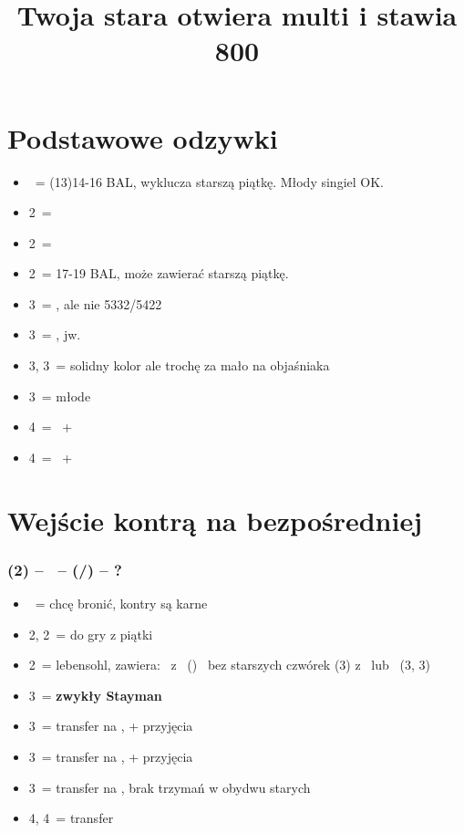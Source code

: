\documentclass[12pt, a4paper]{article}
\title{Twoja stara otwiera multi i stawia 800}
\begin{document}
\section{Podstawowe odzywki}
\begin{itemize}
    \item \dbl\ = (13)14-16 BAL, wyklucza starszą piątkę. Młody singiel OK. \vimp
    \item 2\hearts\ = \hearts
    \item 2\spades\ = \spades
    \item 2\nt\ = 17-19 BAL, może zawierać starszą piątkę. \imp \br
    \item 3\clubs\ = \clubs, ale nie 5332/5422
    \item 3\diams\ = \diams, jw.
    \item 3\hearts, 3\spades\ = solidny kolor ale trochę za mało na objaśniaka
    \item 3\nt\ = młode \vimp
    \item 4\clubs\ = \clubs\ + \hearts\spades
    \item 4\diams\ = \diams\ + \hearts\spades
\end{itemize}

\pagebreak


\section{Wejście kontrą na bezpośredniej}
\subsubsection*{(2\diams) -- \dbl\ -- (\rdbl/\passx) -- ?}
\begin{itemize}
    \item \pass\ = chcę bronić, kontry są karne
    \item 2\hearts, 2\spades\ = do gry z piątki
    \item 2\nt\ = lebensohl, zawiera:
    \subitem \soff\ z \clubs\ (\pass)
    \subitem \gf\ bez starszych czwórek (3\diams) \vimp
    \subitem \inv z \hearts\ lub \spades\ (3\hearts, 3\spades)
    \item 3\clubs\ = \textbf{zwykły Stayman} \vimp
    \item 3\diams\ = transfer na \hearts, \gf + przyjęcia
    \item 3\hearts\ = transfer na \spades, \gf + przyjęcia \br
    \item 3\spades\ = transfer na \nt, brak trzymań w obydwu starych
    \item 4\diams, 4\hearts\ = transfer
\end{itemize}
\end{document}
